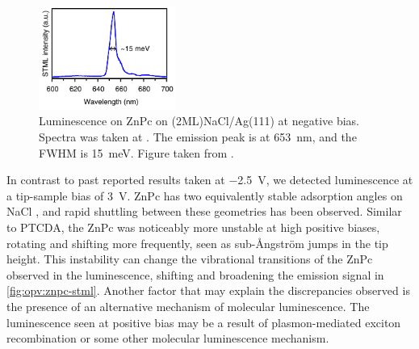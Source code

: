 \begin{figure}
    \centering
    \includegraphics[width=0.4\textwidth]{pictures/znpc_literature.PNG}
    \caption[Luminescence on ZnPc on (2ML)NaCl/Ag(111) at negative bias. Spectra was taken at . The emission peak is at \SI{653}{nm}, and the FWHM is \SI{15}{meV}. ]{Luminescence on ZnPc on (2ML)NaCl/Ag(111) at negative bias. Spectra was taken at . The emission peak is at \SI{653}{nm}, and the FWHM is \SI{15}{meV}. Figure taken from \citep{zhang2017sub}.}
    \label{fig:opv:znpc_literature}
\end{figure}


In contrast to past reported results taken at \SI{-2.5}{V}, we detected luminescence at a tip-sample bias of \SI{3}{V}. ZnPc has two equivalently stable adsorption angles on NaCl \citep{Miwa2016}, and rapid shuttling between these geometries has been observed. Similar to PTCDA, the ZnPc was noticeably more unstable at high positive biases, rotating and shifting more frequently, seen as sub-\AA ngstr\"om jumps in the tip height. This instability can change the vibrational transitions of the ZnPc observed in the luminescence, shifting and broadening the emission signal in \autoref{fig:opv:znpc-stml}. Another factor that may explain the discrepancies observed is the presence of an alternative mechanism of molecular luminescence. The luminescence seen at positive bias may be a result of plasmon-mediated exciton recombination or some other molecular luminescence mechanism.










